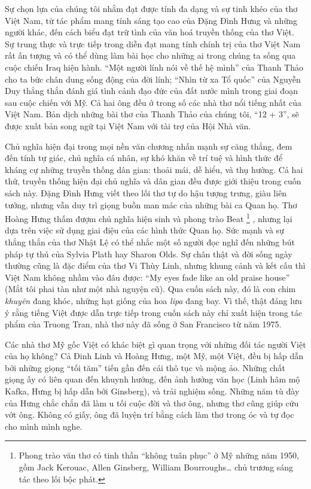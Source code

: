 \documentclass[../main.tex]{subfiles}
\begin{document}
\begin{multicols}{2}
Sự chọn lựa của chúng tôi nhắm đạt được tính đa dạng và sự tinh khéo của thơ Việt Nam, từ tác phẩm mang tính sáng tạo cao của Đặng Đình Hưng và những người khác, đến cách biểu đạt trữ tình của văn hoá truyền thống của thơ Việt. Sự trung thực và trực tiếp trong diễn đạt mang tính chính trị của thơ Việt Nam rất ấn tượng và có thể dùng làm bài học cho những ai trong chúng ta sống qua cuộc chiến Iraq hiện hành. “Một người lính nói về thế hệ mình” của Thanh Thảo cho ta bức chân dung sống động của đời lính; “Nhìn từ xa Tổ quốc” của Nguyễn Duy thẳng thắn đánh giá tình cảnh đạo đức của đất nước mình trong giai đoạn sau cuộc chiến với Mỹ. Cả hai ông đều ở trong số các nhà thơ nổi tiếng nhất của Việt Nam. Bản dịch những bài thơ của Thanh Thảo của chúng tôi, “12 + 3”, sẽ được xuất bản song ngữ tại Việt Nam với tài trợ của Hội Nhà văn. 
 
Chủ nghĩa hiện đại trong mọi nền văn chương nhấn mạnh sự căng thẳng, đem đến tính tự giác, chủ nghĩa cá nhân, sự khó khăn về trí tuệ và hình thức để kháng cự những truyền thống dân gian: thoải mái, dễ hiểu, và thụ hưởng. Cả hai thứ, truyền thống hiện đại chủ nghĩa và dân gian đều được giới thiệu trong cuốn sách này. Đặng Đình Hưng viết theo lối thơ tự do hậu tượng trưng, giàu liên tưởng, nhưng vẫn duy trì giọng buồn man mác của những bài ca Quan họ. Thơ Hoàng Hưng thấm đượm chủ nghĩa hiện sinh và phong trào Beat \footnote{
Phong trào văn thơ có tinh thần “không tuân phục” ở Mỹ những năm 1950, gồm Jack Kerouac, Allen Ginsberg, William Bourroughs… chủ trương sáng tác theo lối bộc phát.} , nhưng lại dựa trên việc sử dụng giai điệu của các hình thức Quan họ. Sức mạnh và sự thẳng thắn của thơ Nhật Lệ có thể nhắc một số người đọc nghĩ đến những bút pháp tự thú của Sylvia Plath hay Sharon Olds. Sự chân thật và đời sống ngày thường cũng là đặc điểm của thơ Vi Thùy Linh, nhưng khung cảnh và kết cấu thì Việt Nam không nhầm vào đâu được: “My eyes fade like an old praise house” (Mắt tôi phai tàn như một nhà nguyện cũ). Qua cuốn sách này, đó là con chim \textit{khuyên }đang khóc\textit{, }những hạt giống của hoa \textit{lipa }đang bay. Vì thế, thật đáng lưu ý rằng tiếng Việt được dẫn trực tiếp trong cuốn sách này chỉ xuất hiện trong tác phẩm của Truong Tran, nhà thơ này đã sống ở San Francisco từ năm 1975. 
 
Các nhà thơ Mỹ gốc Việt có khác biệt gì quan trọng với những đối tác người Việt của họ không? Cả Đinh Linh và Hoàng Hưng, một Mỹ, một Việt, đều bị hấp dẫn bởi những giọng “tối tăm” tiến gần đến cái thô tục và mộng ảo. Những chất giọng ấy có liên quan đến khuynh hướng, đến ảnh hưởng văn học (Linh hâm mộ Kafka, Hưng bị hấp dẫn bởi Ginsberg), và trải nghiệm sống. Những năm tù đày của Hưng chắc chắn đã làm u tối cuộc đời và thơ ông, nhưng thơ cũng giúp cứu vớt ông. Không có giấy, ông đã luyện trí bằng cách làm thơ trong óc và tự đọc cho mình mình nghe. 
 

\end{multicols}
\end{document}
